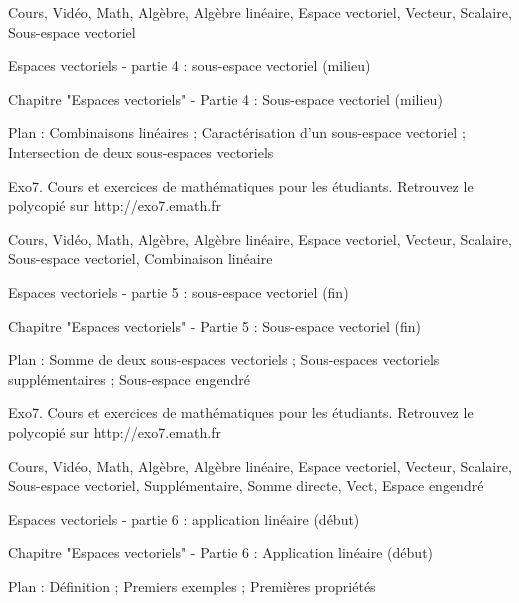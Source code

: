 Cours, Vidéo, Math, Algèbre, Algèbre linéaire, Espace vectoriel, 
Vecteur, Scalaire, Sous-espace vectoriel



Espaces vectoriels - partie 4 : sous-espace vectoriel (milieu)



Chapitre "Espaces vectoriels" - Partie 4 : Sous-espace vectoriel (milieu)

Plan : Combinaisons linéaires ; Caractérisation d'un sous-espace vectoriel ;
Intersection de deux sous-espaces vectoriels

Exo7. Cours et exercices de mathématiques pour les étudiants.
Retrouvez le polycopié sur http://exo7.emath.fr


Cours, Vidéo, Math, Algèbre, Algèbre linéaire, Espace vectoriel, 
Vecteur, Scalaire, Sous-espace vectoriel, Combinaison linéaire



Espaces vectoriels - partie 5 : sous-espace vectoriel (fin)



Chapitre "Espaces vectoriels" - Partie 5 : Sous-espace vectoriel (fin)

Plan : Somme de deux sous-espaces vectoriels ; Sous-espaces vectoriels supplémentaires ;
Sous-espace engendré

Exo7. Cours et exercices de mathématiques pour les étudiants.
Retrouvez le polycopié sur http://exo7.emath.fr


Cours, Vidéo, Math, Algèbre, Algèbre linéaire, Espace vectoriel, 
Vecteur, Scalaire, Sous-espace vectoriel, Supplémentaire, Somme directe, 
Vect, Espace engendré



Espaces vectoriels - partie 6 : application linéaire (début)



Chapitre "Espaces vectoriels" - Partie 6 : Application linéaire (début)

Plan : Définition ; Premiers exemples ; Premières propriétés

